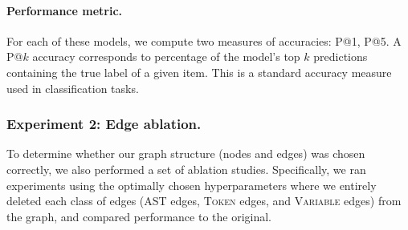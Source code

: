 
\paragraph{Performance metric.}
For each of these models, we compute two measures of accuracies: \textsc{P@1}, \textsc{P@5}.
A \textsc{P@}$k$ accuracy corresponds to percentage of the model's top $k$ predictions containing the true label of a given item.
This is a standard accuracy measure used in classification tasks.

\subsubsection{Experiment 2: Edge ablation.}
To determine whether our graph structure (nodes and edges) was chosen correctly, we also performed a set of ablation studies.
Specifically, we ran experiments using the optimally chosen hyperparameters where we entirely deleted each class of edges (AST edges, \textsc{Token} edges, and \textsc{Variable} edges) from the graph, and compared performance to the original.

